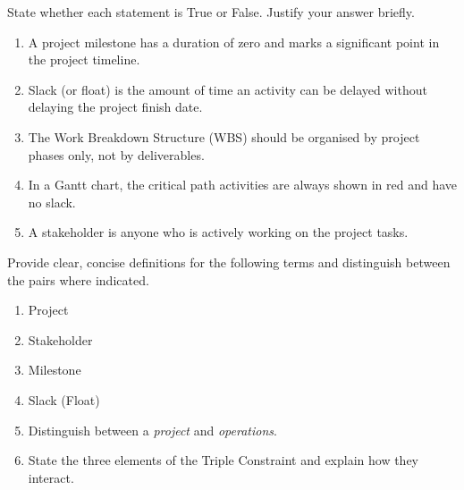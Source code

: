 \documentclass[11pt]{article}
\begin{document}
\begin{exercice}
State whether each statement is True or False. Justify your answer briefly.
\begin{enumerate}
    \item A project milestone has a duration of zero and marks a significant point in the project timeline.
    \item Slack (or float) is the amount of time an activity can be delayed without delaying the project finish date.
    \item The Work Breakdown Structure (WBS) should be organised by project phases only, not by deliverables.
    \item In a Gantt chart, the critical path activities are always shown in red and have no slack.
    \item A stakeholder is anyone who is actively working on the project tasks.
\end{enumerate}
\end{exercice}

\begin{exercice}
Provide clear, concise definitions for the following terms and distinguish between the pairs where indicated.
\begin{enumerate}
    \item Project
    \item Stakeholder
    \item Milestone
    \item Slack (Float)
    \item Distinguish between a \emph{project} and \emph{operations}.
    \item State the three elements of the Triple Constraint and explain how they interact.
\end{enumerate}
\end{exercice}
\end{document}
